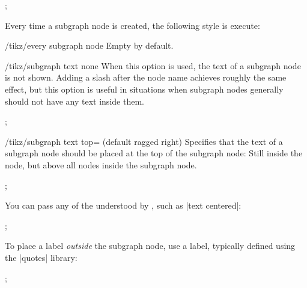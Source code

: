 \begin{codeexample}[] 
\tikz [subgraph text bottom=text centered,
       every subgraph node/.style={font=\itshape}]
  ;
\end{codeexample}  



Every time a subgraph node is created, the  following style is execute: 

\begin{key}{/tikz/every subgraph node}
  Empty by default.
\end{key}

\begin{key}{/tikz/subgraph text none}
  When this option is used, the text of a subgraph node is not
  shown. Adding a slash after the node name achieves roughly the same
  effect, but this option is useful in situations when subgraph nodes
  generally should not have any text inside them.
\begin{codeexample}[] 
  ;
\end{codeexample}  

\end{key}

\begin{key}{/tikz/subgraph text top= (default ragged right)}
  Specifies that the text of a subgraph node should be placed at the
  top of the subgraph node: Still inside the node, but above all nodes
  inside the subgraph node.
\begin{codeexample}[] 
  ;
\end{codeexample}  
  You can pass any of the  understood by
  \tikzname, such as |text centered|:
\begin{codeexample}[width=5cm] 
\tikz [subgraph text top=text centered]
  ;
\end{codeexample}   
  To place a label \emph{outside} the subgraph node, use a label,
  typically defined using the |quotes| library:
\begin{codeexample}[] 
\tikz {};
\end{codeexample}  
\end{key}


